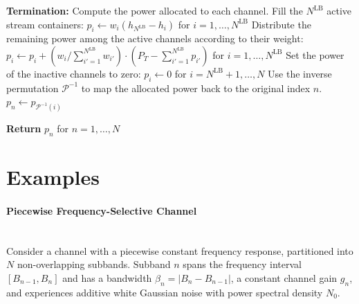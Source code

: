 \begin{algorithm}[!htbp]
\begin{algorithmic}[1]
    \medskip
    \Statex \hspace{-\algorithmicindent}\textbf{Termination:} Compute the power allocated to each channel.
    \Statex \hspace{-\algorithmicindent} Fill the $N^{\mathrm{LB}}$ active stream containers:
    \State $p_i \leftarrow w_i \left(h_{N^{\mathrm{LB}}} - h_i\right)$ \quad for $i = 1, \dots, N^{\mathrm{LB}}$
    \Statex \hspace{-\algorithmicindent} Distribute the remaining power among the active channels according to their weight:
    \State $p_i \leftarrow p_i + (w_i / \textstyle\sum_{i'=1}^{N^{\mathrm{LB}}} w_{i'}) \cdot (P_T - \textstyle\sum_{i'=1}^{N^{\mathrm{LB}}} p_{i'})$ \quad for $i = 1, \dots, N^{\mathrm{LB}}$
    \Statex \hspace{-\algorithmicindent} Set the power of the inactive channels to zero:
    \State $p_i \leftarrow 0$ \quad for $i = N^{\mathrm{LB}} + 1, \dots, N$
    \Statex \hspace{-\algorithmicindent} Use the inverse permutation $\mathcal{P}^{-1}$ to map the allocated power back to the original index $n$.
    \State $p_n \leftarrow p_{\mathcal{P}^{-1}(i)}$
    
    \medskip
    \Statex \hspace{-\algorithmicindent}\textbf{Return} $p_n$ for $n = 1, \dots, N$

\end{algorithmic}
\end{algorithm}


\section{Examples}
\label{appendix_section:waterfilling_examples}

\paragraph{Piecewise Frequency-Selective Channel}~\\
Consider a channel with a piecewise constant frequency response, partitioned into $N$ non-overlapping subbands.
Subband $n$ spans the frequency interval $[B_{n-1}, B_n]$ and has a bandwidth $\beta_n = |B_n - B_{n-1}|$, a constant channel gain $g_n$, and experiences additive white Gaussian noise with power spectral density $N_0$.

